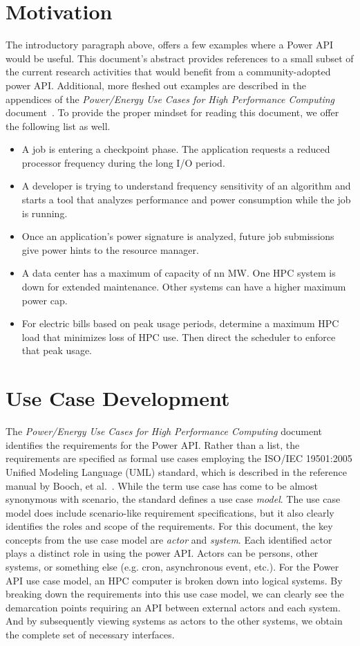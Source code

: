 \documentclass[12pt]{report} %
\begin{document}
\section{Motivation}\label{sec:Motivation}
The introductory paragraph above, offers a few examples where a Power API would be useful. 
This document's abstract provides references to a small subset of the current research activities that would benefit from a community-adopted power API.
Additional, more fleshed out examples are described in the appendices of the \emph{Power/Energy Use Cases for High Performance Computing} document~\cite{Laros:2013:PwrUseCase}.
To provide the proper mindset for reading this document, we offer the following list as well.
\begin{itemize}
\item A job is entering a checkpoint phase. The application requests a reduced processor frequency during the long I/O period.
\item A developer is trying to understand frequency sensitivity of an algorithm and starts a tool that analyzes performance and power consumption while the job is running.
\item Once an application's power signature is analyzed, future job submissions give power hints to the resource manager.
\item A data center has a maximum of capacity of nn MW. One HPC system is down for extended maintenance. Other systems can have a higher maximum power cap.
\item For electric bills based on peak usage periods, determine a maximum HPC load that minimizes loss of HPC use. Then direct the scheduler to enforce that peak usage.
\end{itemize}

\section{Use Case Development}\label{sec:UseCase}
The \emph{Power/Energy Use Cases for High Performance Computing} document~\cite{Laros:2013:PwrUseCase} identifies the requirements for the Power API.
Rather than a list, the requirements are specified as formal use cases employing the ISO/IEC 19501:2005 Unified Modeling Language (UML) standard, which is described in the reference manual by Booch, et al.~\cite{GangOfThree:1999}.
While the term use case has come to be almost synonymous with scenario, the standard defines a use case \emph{model}.
The use case model does include scenario-like requirement specifications, but it also clearly identifies the roles and scope of the requirements. 
For this document, the key concepts from the use case model are \emph{actor} and \emph{system}.
Each identified actor plays a distinct role in using the power API. 
Actors can be persons, other systems, or something else (e.g. cron, asynchronous event, etc.). 
For the Power API use case model, an HPC computer is broken down into logical systems.
By breaking down the requirements into this use case model, we can clearly see the demarcation points requiring an API between external actors and each system. 
And by subsequently viewing systems as actors to the other systems, we obtain the complete set of necessary interfaces.
\end{document}
